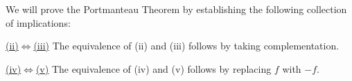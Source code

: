 \proof
We will prove the Portmanteau Theorem by establishing the following collection
of implications:
\vskip 0.5cm
\begin{center}
\end{center}


\vskip 0.5cm \noindent
\underline{(ii)\;$\Longleftrightarrow$\;(iii)}
\vskip 0.2cm \noindent
The equivalence of (ii) and (iii) follows by taking complementation.

\vskip 0.5cm \noindent
\underline{(iv)\;$\Longleftrightarrow$\;(v)}
\vskip 0.2cm \noindent
The equivalence of (iv) and (v) follows by replacing $f$ with $-f$.

